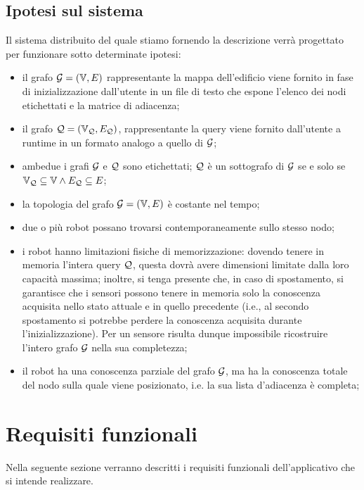 \documentclass{llncs}
\begin{document}
\subsection{Ipotesi sul sistema}
\label{sec:hypotesis}
Il sistema distribuito del quale stiamo fornendo la descrizione verrà progettato per funzionare
sotto determinate ipotesi:
\begin{itemize}
\item il grafo $\mathcal{G} = ( \mathbb{V}, E)$ rappresentante la mappa dell'edificio viene fornito
  in fase di inizializzazione dall'utente in un
  file di testo che espone l'elenco dei nodi etichettati e la matrice di adiacenza;
\item il grafo  $\mathcal{Q} = (\mathbb{V}_{\mathcal{Q}}, E_{\mathcal{Q}})$, rappresentante la query viene fornito dall'utente
  a runtime in un formato analogo a quello di $\mathcal{G}$;
\item ambedue i grafi $\mathcal{G}$ e $\mathcal{Q}$ sono etichettati; $\mathcal{Q}$ è un sottografo di $\mathcal{G}$ se e solo se
  $\mathbb{V}_{\mathcal{Q}} \subseteq \mathbb{V} \wedge E_{\mathcal{Q}} \subseteq E$;
\item la topologia del grafo $\mathcal{G} = ( \mathbb{V}, E)$ è costante nel tempo;
\item due o più robot possano trovarsi contemporaneamente sullo stesso nodo;
\item i robot hanno limitazioni fisiche di memorizzazione:
  dovendo tenere in memoria l'intera query $\mathcal{Q}$, questa dovrà avere
  dimensioni limitate dalla loro capacità massima; inoltre,
  si tenga presente che, in caso di spostamento, si garantisce che i sensori
  possono tenere in memoria solo la conoscenza acquisita nello stato attuale e in quello
  precedente (i.e., al secondo spostamento si potrebbe perdere la conoscenza acquisita
  durante l'inizializzazione).
  Per un sensore risulta dunque impossibile ricostruire l'intero grafo $\mathcal{G}$ nella sua completezza;
\item il robot ha una conoscenza parziale del grafo $\mathcal{G}$, ma ha la conoscenza
  totale del nodo sulla quale viene posizionato, i.e. la sua lista d'adiacenza è completa;
\end{itemize}
%
%
\section{Requisiti funzionali}
Nella seguente sezione verranno descritti i requisiti funzionali
dell'applicativo che si intende realizzare.
\end{document}
